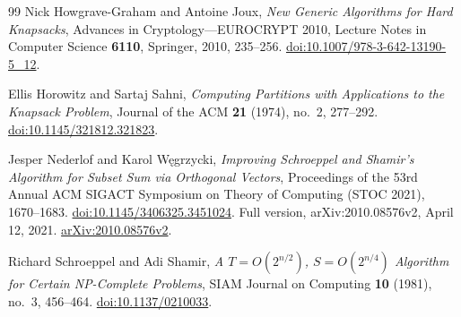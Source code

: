 \begin{thebibliography}{99}
Nick Howgrave-Graham and Antoine Joux,
\emph{New Generic Algorithms for Hard Knapsacks},
Advances in Cryptology---EUROCRYPT 2010,
Lecture Notes in Computer Science \textbf{6110}, Springer, 2010, 235--256.
\href{https://doi.org/10.1007/978-3-642-13190-5_12}
{doi:10.1007/978-3-642-13190-5\_12}.

Ellis Horowitz and Sartaj Sahni,
\emph{Computing Partitions with Applications to the Knapsack Problem},
Journal of the ACM \textbf{21} (1974), no.~2, 277--292.
\href{https://doi.org/10.1145/321812.321823}
{doi:10.1145/321812.321823}.

Jesper Nederlof and Karol W\k{e}grzycki,
\emph{Improving Schroeppel and Shamir's Algorithm for Subset Sum via
Orthogonal Vectors},
Proceedings of the 53rd Annual ACM SIGACT Symposium on Theory of Computing
(STOC 2021), 1670--1683.
\href{https://doi.org/10.1145/3406325.3451024}
{doi:10.1145/3406325.3451024}.
Full version, arXiv:2010.08576v2, April 12, 2021.
\href{https://arxiv.org/abs/2010.08576v2}{arXiv:2010.08576v2}.

Richard Schroeppel and Adi Shamir,
\emph{A $T=O(2^{n/2})$, $S=O(2^{n/4})$ Algorithm for Certain
NP-Complete Problems},
SIAM Journal on Computing \textbf{10} (1981), no.~3, 456--464.
\href{https://doi.org/10.1137/0210033}{doi:10.1137/0210033}.

\end{thebibliography}
